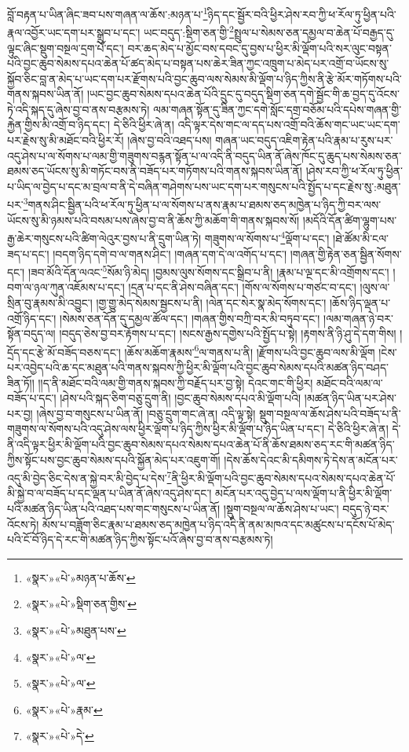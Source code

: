 བློ་བརྟན་པ་ཡིན་ཞིང་ཟབ་པས་གཞན་ལ་ཆོས་:མཉན་པ་\footnote{«སྣར་»«པེ་»མཉན་པ་ཆོས་}ཉིད་དང་སྦྱོར་བའི་ཕྱིར་ཤེས་རབ་ཀྱི་ཕ་རོལ་ཏུ་ཕྱིན་པའི་རྣལ་འབྱོར་ཡང་དག་པར་སྒྲུབ་པ་དང་། ཡང་བདུད་:སྡིག་ཅན་གྱི་\footnote{«སྣར་»«པེ་»སྡིག་ཅན་གྱིས་}སྤྲུལ་པ་སེམས་ཅན་དམྱལ་བ་ཆེན་པོ་བརྒྱད་དུ་ལྟུང་ཞིང་སྡུག་བསྔལ་དྲག་པོ་དང་། བར་ཆད་མེད་པ་མྱོང་བས་དབང་དུ་བྱས་པ་ཕྱིར་མི་ལྡོག་པའི་སར་ལུང་བསྟན་པའི་བྱང་ཆུབ་སེམས་དཔའ་ཆེན་པོ་ཚད་མེད་པ་བསྟན་པས་ཆེར་ཟིན་ཀྱང་འཁྲུག་པ་མེད་པར་འགྲོ་བ་ཡོངས་སུ་སྐྱོབ་ཅིང་བླ་ན་མེད་པ་ཡང་དག་པར་རྫོགས་པའི་བྱང་ཆུབ་ལས་སེམས་མི་ལྡོག་པ་ཉིད་ཀྱིས་ནི་རྩེ་མོར་གཏོགས་པའི་གནས་སྐབས་ཡིན་ནོ། །ཡང་བྱང་ཆུབ་སེམས་དཔའ་ཆེན་པོའི་དྲུང་དུ་བདུད་སྡིག་ཅན་དགེ་སྦྱོང་གི་ཆ་བྱད་དུ་འོངས་ཏེ་འདི་སྐད་དུ་ཞེས་བྱ་བ་ནས་བརྩམས་ཏེ། ལམ་གཞན་སྟོན་དུ་ཟིན་ཀྱང་དགེ་སློང་དགྲ་བཅོམ་པའི་དཔེས་གཞན་གྱི་རྐྱེན་གྱིས་མི་འགྲོ་བ་ཉིད་དང་། དེ་ཅིའི་ཕྱིར་ཞེ་ན། འདི་ལྟར་དེས་གང་ལ་དད་པས་འགྲོ་བའི་ཆོས་གང་ཡང་ཡང་དག་པར་རྗེས་སུ་མི་མཐོང་བའི་ཕྱིར་རོ། །ཞེས་བྱ་བའི་འཐད་པས། གཞན་ཡང་བདུད་འཇིག་རྟེན་པའི་རྣམ་པ་རུས་པར་འདུ་ཤེས་པ་ལ་སོགས་པ་ལམ་གྱི་གཟུགས་བརྙན་སྟོན་པ་ལ་འདི་ནི་བདུད་ཡིན་ནོ་ཞེས་ཁོང་དུ་ཆུད་པས་སེམས་ཅན་ཐམས་ཅད་ཡོངས་སུ་མི་གཏོང་བས་ནི་བཟོད་པར་གཏོགས་པའི་གནས་སྐབས་ཡིན་ནོ། །ཤེས་རབ་ཀྱི་ཕ་རོལ་ཏུ་ཕྱིན་པ་ཡིད་ལ་བྱེད་པ་དང་མ་བྲལ་བ་ནི་དེ་བཞིན་གཤེགས་པས་ཡང་དག་པར་གསུངས་པའི་སྤྱོད་པ་དང་རྗེས་སུ་:མཐུན་པར་\footnote{«སྣར་»«པེ་»མཐུན་པས་}གནས་ཤིང་སྦྱིན་པའི་ཕ་རོལ་ཏུ་ཕྱིན་པ་ལ་སོགས་པ་ནས་རྣམ་པ་ཐམས་ཅད་མཁྱེན་པ་ཉིད་ཀྱི་བར་ལས་ཡོངས་སུ་མི་ཉམས་པའི་བསམ་པས་ཞེས་བྱ་བ་ནི་ཆོས་ཀྱི་མཆོག་གི་གནས་སྐབས་སོ། །མདོའི་དོན་ཚིག་ལྷུག་པས་རྒྱ་ཆེར་གསུངས་པའི་ཚིག་ལེའུར་བྱས་པ་ནི་དྲུག་ཡིན་ཏེ། གཟུགས་ལ་སོགས་པ་\footnote{«སྣར་»«པེ་»ལ་}ལྡོག་པ་དང་། །ཐེ་ཚོམ་མི་ངལ་ཟད་པ་དང་། །བདག་ཉིད་དགེ་བ་ལ་གནས་ཤིང་། །གཞན་དག་དེ་ལ་འགོད་པ་དང་། །གཞན་གྱི་རྟེན་ཅན་སྦྱིན་སོགས་དང་། །ཟབ་མོའི་དོན་ལའང་\footnote{«སྣར་»«པེ་»ལ་}སོམ་ཉི་མེད། །བྱམས་ལུས་སོགས་དང་སྒྲིབ་པ་ནི། །རྣམ་པ་ལྔ་དང་མི་འགྲོགས་དང་། །བག་ལ་ཉལ་ཀུན་འཇོམས་པ་དང་། །དྲན་པ་དང་ནི་ཤེས་བཞིན་དང་། །གོས་ལ་སོགས་པ་གཙང་བ་དང་། །ལུས་ལ་སྲིན་བུ་རྣམས་མི་འབྱུང་། །གྱ་གྱུ་མེད་སེམས་སྦྱངས་པ་ནི། །ལེན་དང་སེར་སྣ་མེད་སོགས་དང་། །ཆོས་ཉིད་ལྡན་པ་འགྲོ་ཉིད་དང་། །སེམས་ཅན་དོན་དུ་དམྱལ་ཚོལ་དང་། །གཞན་གྱིས་བཀྲི་བར་མི་བཏུབ་དང་། །ལམ་གཞན་ཉེ་བར་སྟོན་བདུད་ལ། །བདུད་ཅེས་བྱ་བར་རྟོགས་པ་དང་། །སངས་རྒྱས་དགྱེས་པའི་སྤྱོད་པ་སྟེ། །རྟགས་ནི་ཉི་ཤུ་དེ་དག་གིས། །དྲོད་དང་རྩེ་མོ་བཟོད་བཅས་དང་། །ཆོས་མཆོག་རྣམས་\footnote{«སྣར་»«པེ་»རྣམ་}ལ་གནས་པ་ནི། །རྫོགས་པའི་བྱང་ཆུབ་ལས་མི་ལྡོག །ངེས་པར་འབྱེད་པའི་ཆ་དང་མཐུན་པའི་གནས་སྐབས་ཀྱི་ཕྱིར་མི་ལྡོག་པའི་བྱང་ཆུབ་སེམས་དཔའི་མཚན་ཉིད་བཤད་ཟིན་ཏོ།། །།ད་ནི་མཐོང་བའི་ལམ་གྱི་གནས་སྐབས་ཀྱི་བརྗོད་པར་བྱ་སྟེ། དེའང་གང་གི་ཕྱིར། མཐོང་བའི་ལམ་ལ་བཟོད་པ་དང་། །ཤེས་པའི་སྐད་ཅིག་བཅུ་དྲུག་ནི། །བྱང་ཆུབ་སེམས་དཔའ་མི་ལྡོག་པའི། །མཚན་ཉིད་ཡིན་པར་ཤེས་པར་བྱ། །ཞེས་བྱ་བ་གསུངས་པ་ཡིན་ནོ། །བཅུ་དྲུག་གང་ཞེ་ན། འདི་ལྟ་སྟེ། སྡུག་བསྔལ་ལ་ཆོས་ཤེས་པའི་བཟོད་པ་ནི་གཟུགས་ལ་སོགས་པའི་འདུ་ཤེས་ལས་ཕྱིར་ལྡོག་པ་ཉིད་ཀྱིས་ཕྱིར་མི་ལྡོག་པ་ཉིད་ཡིན་པ་དང་། དེ་ཅིའི་ཕྱིར་ཞེ་ན། དེ་ནི་འདི་ལྟར་ཕྱིར་མི་ལྡོག་པའི་བྱང་ཆུབ་སེམས་དཔའ་སེམས་དཔའ་ཆེན་པོ་ནི་ཆོས་ཐམས་ཅད་རང་གི་མཚན་ཉིད་ཀྱིས་སྟོང་པས་བྱང་ཆུབ་སེམས་དཔའི་སྐྱོན་མེད་པར་འཇུག་གོ། །དེས་ཆོས་དེའང་མི་དམིགས་ཏེ་དེས་ན་མངོན་པར་འདུ་མི་བྱེད་ཅིང་དེས་ན་སྐྱེ་བར་མི་བྱེད་པ་དེས་\footnote{«སྣར་»«པེ་»དེ་}ནི་ཕྱིར་མི་ལྡོག་པའི་བྱང་ཆུབ་སེམས་དཔའ་སེམས་དཔའ་ཆེན་པོ་མི་སྐྱེ་བ་ལ་བཟོད་པ་དང་ལྡན་པ་ཡིན་ནོ་ཞེས་འདུ་ཤེས་དང་། མངོན་པར་འདུ་བྱེད་པ་ལས་ལྡོག་པ་ནི་ཕྱིར་མི་ལྡོག་པའི་མཚན་ཉིད་ཡིན་པའི་འཐད་པས་གང་གསུངས་པ་ཡིན་ནོ། །སྡུག་བསྔལ་ལ་ཆོས་ཤེས་པ་ཡང་། བདུད་ཉེ་བར་འོངས་ཏེ། མོས་པ་བཟློག་ཅིང་རྣམ་པ་ཐམས་ཅད་མཁྱེན་པ་ཉིད་འདི་ནི་ནམ་མཁའ་དང་མཚུངས་པ་དངོས་པོ་མེད་པའི་ངོ་བོ་ཉིད་དེ་རང་གི་མཚན་ཉིད་ཀྱིས་སྟོང་པའོ་ཞེས་བྱ་བ་ནས་བརྩམས་ཏེ། 